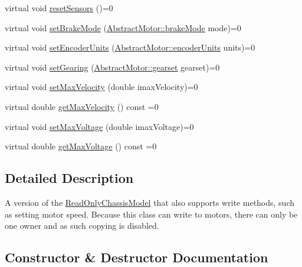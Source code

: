 \begin{DoxyCompactItemize}
virtual void \mbox{\hyperlink{classokapi_1_1ChassisModel_a6bd7e6bb60d41d3f1f5a5a129acfe1b6}{reset\+Sensors}} ()=0
\item 
virtual void \mbox{\hyperlink{classokapi_1_1ChassisModel_a20e3cde96d536e6c722aa5686e5cc8e8}{set\+Brake\+Mode}} (\mbox{\hyperlink{classokapi_1_1AbstractMotor_a132e0485dbb59a60c3f934338d8fa601}{Abstract\+Motor\+::brake\+Mode}} mode)=0
\item 
virtual void \mbox{\hyperlink{classokapi_1_1ChassisModel_ae8ba9a72bf827af4c6feffaac99b33ee}{set\+Encoder\+Units}} (\mbox{\hyperlink{classokapi_1_1AbstractMotor_ae811cd825099f2defadeb1b7f7e7764c}{Abstract\+Motor\+::encoder\+Units}} units)=0
\item 
virtual void \mbox{\hyperlink{classokapi_1_1ChassisModel_a960d6ce2f21e5832fce1d7566408cb61}{set\+Gearing}} (\mbox{\hyperlink{classokapi_1_1AbstractMotor_a88aaa6ea2fa10f5520a537bbf26774d5}{Abstract\+Motor\+::gearset}} gearset)=0
\item 
virtual void \mbox{\hyperlink{classokapi_1_1ChassisModel_ae7fcb4cc95fdd7fd3c8f8388b4a698b2}{set\+Max\+Velocity}} (double imax\+Velocity)=0
\item 
virtual double \mbox{\hyperlink{classokapi_1_1ChassisModel_ab45dd7430636ed1c1dee25dae6df5d46}{get\+Max\+Velocity}} () const =0
\item 
virtual void \mbox{\hyperlink{classokapi_1_1ChassisModel_a2fb261636b79e118f22530cc3fce4f41}{set\+Max\+Voltage}} (double imax\+Voltage)=0
\item 
virtual double \mbox{\hyperlink{classokapi_1_1ChassisModel_a3ced2121524ae523592db64733c69472}{get\+Max\+Voltage}} () const =0
\end{DoxyCompactItemize}


\subsection{Detailed Description}
A version of the \mbox{\hyperlink{classokapi_1_1ReadOnlyChassisModel}{Read\+Only\+Chassis\+Model}} that also supports write methods, such as setting motor speed. Because this class can write to motors, there can only be one owner and as such copying is disabled. 

\subsection{Constructor \& Destructor Documentation}
\mbox{\label{classokapi_1_1ChassisModel_ae292afae5511e46eec17cf0f9bad1bb6}} 
